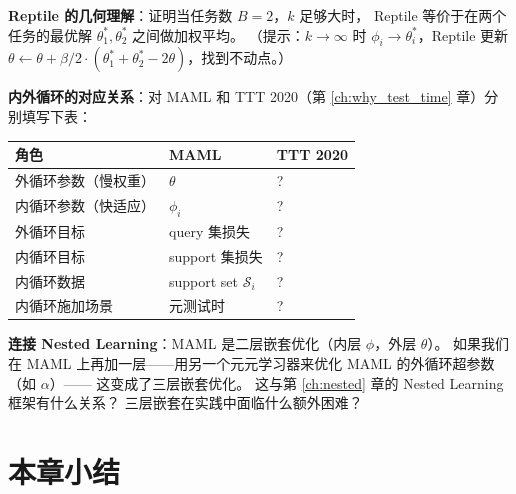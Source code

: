 \begin{exercise}
\textbf{Reptile 的几何理解}：证明当任务数 $B=2$，$k$ 足够大时，
Reptile 等价于在两个任务的最优解 $\theta_1^*, \theta_2^*$ 之间做加权平均。
（提示：$k\to\infty$ 时 $\phi_i \to \theta_i^*$，Reptile 更新 $\theta \leftarrow \theta + \beta/2 \cdot (\theta_1^* + \theta_2^* - 2\theta)$，找到不动点。）
\end{exercise}

\begin{exercise}
\textbf{内外循环的对应关系}：对 MAML 和 TTT 2020（第 \ref{ch:why_test_time} 章）分别填写下表：

\begin{center}
\begin{tabular}{lll}
\toprule
角色 & MAML & TTT 2020 \\
\midrule
外循环参数（慢权重） & $\theta$ & ? \\
内循环参数（快适应） & $\phi_i$ & ? \\
外循环目标 & query 集损失 & ? \\
内循环目标 & support 集损失 & ? \\
内循环数据 & support set $\mathcal{S}_i$ & ? \\
内循环施加场景 & 元测试时 & ? \\
\bottomrule
\end{tabular}
\end{center}
\end{exercise}

\begin{exercise}
\textbf{连接 Nested Learning}：MAML 是二层嵌套优化（内层 $\phi$，外层 $\theta$）。
如果我们在 MAML 上再加一层——用另一个元元学习器来优化 MAML 的外循环超参数（如 $\alpha$）——
这变成了三层嵌套优化。
这与第 \ref{ch:nested} 章的 Nested Learning 框架有什么关系？
三层嵌套在实践中面临什么额外困难？
\end{exercise}

\section{本章小结}
\label{sec:bilevel_summary}

